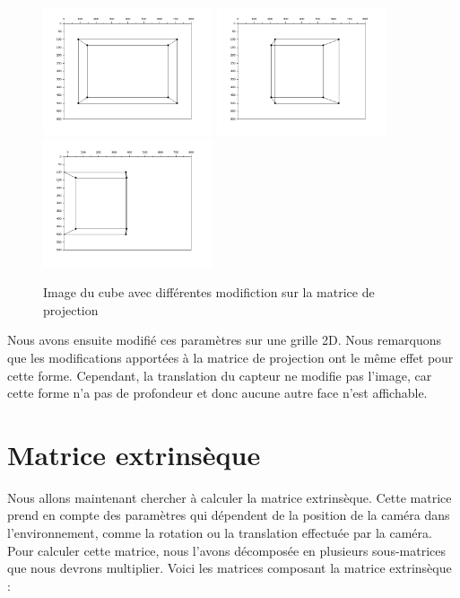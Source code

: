 \documentclass[a4paper,11pt]{article}
\begin{document}
  \begin{figure}[H]
    \center
    \includegraphics[width=5cm]{ProjectionTaille.png}
    \includegraphics[width=5cm]{ProjectionRotation.png}
    \includegraphics[width=5cm]{ProjectionTranslation.png}
    \caption{Image du cube avec différentes modifiction sur la matrice de projection}
  \end{figure}
  
  Nous avons ensuite modifié ces paramètres sur une grille 2D. Nous remarquons que les modifications apportées à la 
  matrice de projection ont le même effet pour cette forme.
  Cependant, la translation du capteur ne modifie pas l'image, car cette forme n'a pas de profondeur et donc aucune autre face n'est affichable.
  
  \section{Matrice extrinsèque}
  
  Nous allons maintenant chercher à calculer la matrice extrinsèque. Cette matrice prend en compte des paramètres qui dépendent de la position 
  de la caméra dans l'environnement, comme la rotation ou la translation effectuée par la caméra. Pour calculer cette matrice, nous l'avons 
  décomposée en plusieurs sous-matrices que nous devrons multiplier. Voici les matrices composant la matrice extrinsèque :\\
  
\end{document}
